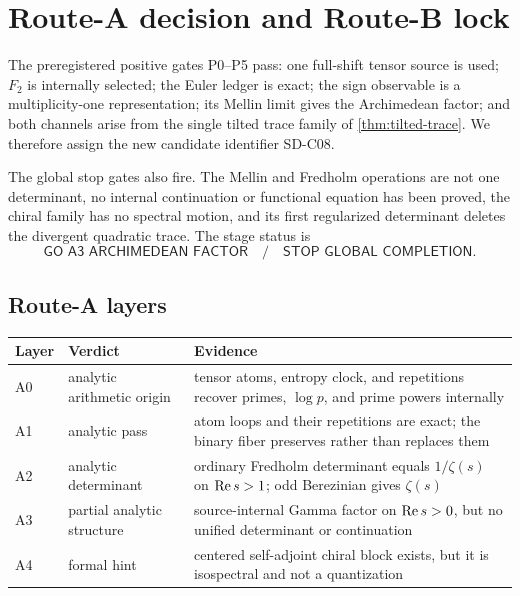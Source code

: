 \section{Route-A decision and Route-B lock}
\label{sec:route}

The preregistered positive gates P0--P5 pass: one full-shift tensor source is
used; $F_2$ is internally selected; the Euler ledger is exact; the sign
observable is a multiplicity-one representation; its Mellin limit gives the
Archimedean factor; and both channels arise from the single tilted trace
family of \cref{thm:tilted-trace}. We therefore assign the new candidate
identifier SD-C08.

The global stop gates also fire. The Mellin and Fredholm operations are not
one determinant, no internal continuation or functional equation has been
proved, the chiral family has no spectral motion, and its first regularized
determinant deletes the divergent quadratic trace. The stage status is
\[
 \boxed{\textsf{GO A3 ARCHIMEDEAN FACTOR}
 \quad/\quad
 \textsf{STOP GLOBAL COMPLETION}.}
\]

\subsection{Route-A layers}

\begin{center}
\small
\begin{tabularx}{0.99\textwidth}{L{0.08\textwidth}L{0.25\textwidth}X}
\toprule
Layer & Verdict & Evidence \\
\midrule
A0 & analytic arithmetic origin & tensor atoms, entropy clock, and repetitions recover primes, $\log p$, and prime powers internally \\
A1 & analytic pass & atom loops and their repetitions are exact; the binary fiber preserves rather than replaces them \\
A2 & analytic determinant & ordinary Fredholm determinant equals $1/\zeta(s)$ on $\operatorname{Re} s>1$; odd Berezinian gives $\zeta(s)$ \\
A3 & partial analytic structure & source-internal Gamma factor on $\operatorname{Re} s>0$, but no unified determinant or continuation \\
A4 & formal hint & centered self-adjoint chiral block exists, but it is isospectral and not a quantization \\
\bottomrule
\end{tabularx}
\end{center}

